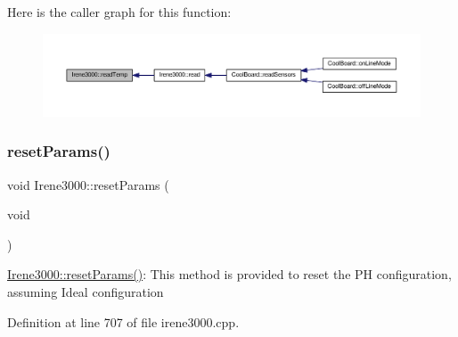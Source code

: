 Here is the caller graph for this function\+:\nopagebreak
\begin{figure}[H]
\begin{center}
\leavevmode
\includegraphics[width=350pt]{d6/d03/class_irene3000_a80bc6dfea106dc3bc54fa20204d4d5dc_icgraph}
\end{center}
\end{figure}
\mbox{\label{class_irene3000_a43b0e44f8d211413ff4e3a0c654205ff}} 
\subsubsection{\texorpdfstring{reset\+Params()}{resetParams()}}
{\footnotesize\ttfamily void Irene3000\+::reset\+Params (\begin{DoxyParamCaption}\item[{void}]{ }\end{DoxyParamCaption})}

\hyperlink{class_irene3000_a43b0e44f8d211413ff4e3a0c654205ff}{Irene3000\+::reset\+Params()}\+: This method is provided to reset the PH configuration, assuming Ideal configuration 

Definition at line 707 of file irene3000.\+cpp.


